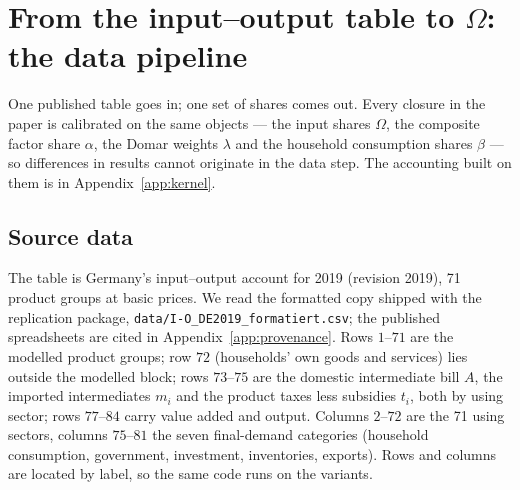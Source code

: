 \section{From the input--output table to $\Omega$: the data pipeline}\label{app:pipeline}

One published table goes in; one set of shares comes out. Every closure in the
paper is calibrated on the same objects --- the input shares $\Omega$, the
composite factor share $\alpha$, the Domar weights $\lambda$ and the household
consumption shares $\beta$ --- so differences in results cannot originate in the
data step. The accounting built on them is in Appendix~\ref{app:kernel}.

\subsection{Source data}\label{app:pipeline-source}

The table is Germany's input--output account for 2019 (revision 2019), 71
product groups at basic prices. We read the formatted copy shipped with the
replication package, \texttt{data/I-O\_DE2019\_formatiert.csv}; the published
spreadsheets are cited in Appendix~\ref{app:provenance}. Rows $1$--$71$ are the
modelled product groups; row $72$ (households' own goods and services) lies
outside the modelled block; rows $73$--$75$ are the domestic intermediate bill
$A$, the imported intermediates $m_i$ and the product taxes less subsidies
$t_i$, both by using sector; rows $77$--$84$ carry value added and output.
Columns $2$--$72$ are the 71 using sectors, columns $75$--$81$ the seven
final-demand categories (household consumption, government, investment,
inventories, exports). Rows and columns are located by
label, so the same code runs on the variants.

